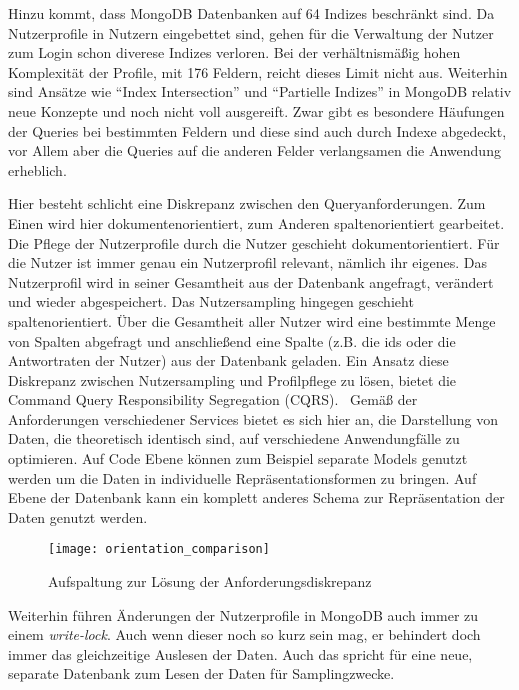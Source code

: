 Hinzu kommt, dass MongoDB Datenbanken auf 64 Indizes beschränkt sind\cite{mongo:indexlimit}. Da Nutzerprofile in Nutzern eingebettet sind, gehen für die Verwaltung der Nutzer zum Login schon diverese Indizes verloren. Bei der verhältnismäßig hohen Komplexität der Profile, mit 176 Feldern, reicht dieses Limit nicht aus.
Weiterhin sind Ansätze wie ``Index Intersection'' und ``Partielle Indizes'' in MongoDB relativ neue Konzepte und noch nicht voll ausgereift\cite{mongo:indexintersection}\cite{mongo:partialindexes}.
Zwar gibt es besondere Häufungen der Queries bei bestimmten Feldern und diese sind auch durch Indexe abgedeckt, vor Allem aber die Queries auf die anderen Felder verlangsamen die Anwendung erheblich.

Hier besteht schlicht eine Diskrepanz zwischen den Queryanforderungen. Zum Einen wird hier dokumentenorientiert, zum Anderen spaltenorientiert gearbeitet.
Die Pflege der Nutzerprofile durch die Nutzer geschieht dokumentorientiert. Für die Nutzer ist immer genau ein Nutzerprofil relevant, nämlich ihr eigenes. Das Nutzerprofil wird in seiner Gesamtheit aus der Datenbank angefragt, verändert und wieder abgespeichert.
Das Nutzersampling hingegen geschieht spaltenorientiert. Über die Gesamtheit aller Nutzer wird eine bestimmte Menge von Spalten abgefragt und anschließend eine Spalte (z.B. die ids oder die Antwortraten der Nutzer) aus der Datenbank geladen.
Ein Ansatz diese Diskrepanz zwischen Nutzersampling und Profilpflege zu lösen, bietet die Command Query Responsibility Segregation (CQRS).~\cite[][]{fowler:cqrs} Gemäß der Anforderungen verschiedener Services bietet es sich hier an, die Darstellung von Daten, die theoretisch identisch sind, auf verschiedene Anwendungfälle zu optimieren. Auf Code Ebene können zum Beispiel separate Models genutzt werden um die Daten in individuelle Repräsentationsformen zu bringen. Auf Ebene der Datenbank kann ein komplett anderes Schema zur Repräsentation der Daten genutzt werden.

\begin{figure}[!ht]
    \centering
    \caption{Aufspaltung zur Lösung der Anforderungsdiskrepanz}
    \label{fig:orientationsplit}
    \texttt{[image: orientation\_comparison]}
\end{figure}

Weiterhin führen Änderungen der Nutzerprofile in MongoDB auch immer zu einem \textit{write-lock}. Auch wenn dieser noch so kurz sein mag, er behindert doch immer das gleichzeitige Auslesen der Daten. Auch das spricht für eine neue, separate Datenbank zum Lesen der Daten für Samplingzwecke.

